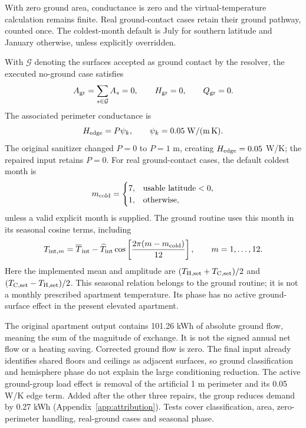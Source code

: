 With zero ground area, conductance is zero and the virtual-temperature calculation remains finite. Real ground-contact cases retain their ground pathway, counted once. The coldest-month default is July for southern latitude and January otherwise, unless explicitly overridden.

With $\mathcal G$ denoting the surfaces accepted as ground contact by the resolver, the executed no-ground case satisfies
\begin{equation}
A_{\rm gr}=\sum_{s\in\mathcal G}A_s=0,\qquad H_{\rm gr}=0,\qquad Q_{\rm gr}=0.
\end{equation}
The associated perimeter conductance is
\begin{equation}
H_{\rm edge}=P\psi_k,\qquad \psi_k=0.05\;\mathrm{W/(m\,K)}.
\end{equation}
The original sanitizer changed $P=0$ to $P=1$ m, creating $H_{\rm edge}=0.05$ W/K; the repaired input retains $P=0$.
For real ground-contact cases, the default coldest month is
\begin{equation}
m_{\rm cold}=\begin{cases}
7,&\text{usable latitude}<0,\\
1,&\text{otherwise},
\end{cases}
\end{equation}
unless a valid explicit month is supplied. The ground routine uses this month in its seasonal cosine terms, including
\begin{equation}
T_{{\rm int},m}=\overline T_{\rm int}
-\widehat T_{\rm int}\cos\left[\frac{2\pi(m-m_{\rm cold})}{12}\right],
\qquad m=1,\ldots,12.
\end{equation}
Here the implemented mean and amplitude are $(T_{\rm H,set}+T_{\rm C,set})/2$ and $(T_{\rm C,set}-T_{\rm H,set})/2$. This seasonal relation belongs to the ground routine; it is not a monthly prescribed apartment temperature. Its phase has no active ground-surface effect in the present elevated apartment.

The original apartment output contains 101.26 kWh of absolute ground flow, meaning the sum of the magnitude of exchange. It is not the signed annual net flow or a heating saving. Corrected ground flow is zero. The final input already identifies shared floors and ceilings as adjacent surfaces, so ground classification and hemisphere phase do not explain the large conditioning reduction. The active ground-group load effect is removal of the artificial 1 m perimeter and its 0.05 W/K edge term. Added after the other three repairs, the group reduces demand by 0.27 kWh (Appendix~\ref{app:attribution}). Tests cover classification, area, zero-perimeter handling, real-ground cases and seasonal phase.

